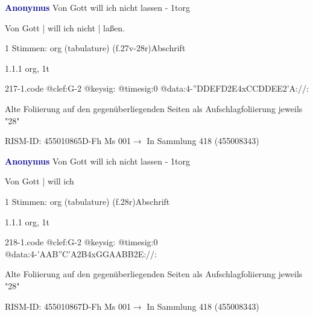 \documentclass[twocolumn, 12pt]{book}
\begin{document}
\par \vspace{16pt} \textcolor{darkblue}{\textbf{Anonymus  }}\hfillplus{\textbf{[217]}}\newline Von Gott will ich nicht lassen - 1t\newline org
\par \begin{itshape}[f.27v, at left:] Von Gott | will ich nicht | laßen.\end{itshape} 
\par \textcolor{darkblue}{}  1 Stimmen: org (tabulature)  (f.27v-28r)\newline Abschrift
\par 1.1.1  org, 1t  
\begin{filecontents*}{217-1.code}
@clef:G-2
@keysig:
@timesig:0
@data:4-''DDEFD2E4xCCDDEE2'A://:
\end{filecontents*}
\newline %
\par Alte Foliierung auf den gegenüberliegenden Seiten als Aufschlagfoliierung jeweils "28"
\par RISM-ID: 455010865\newline D-Fh  Ms 001\newline $\rightarrow$ In Sammlung 418 (455008343)
      
\par \vspace{16pt} \textcolor{darkblue}{\textbf{Anonymus  }}\hfillplus{\textbf{[218]}}\newline Von Gott will ich nicht lassen - 1t\newline org
\par \begin{itshape}[f.28r, at left:] Von Gott | will ich\end{itshape} 
\par \textcolor{darkblue}{}  1 Stimmen: org (tabulature)  (f.28r)\newline Abschrift
\par 1.1.1  org, 1t  
\begin{filecontents*}{218-1.code}
@clef:G-2
@keysig:
@timesig:0
@data:4-'AAB''C'A2B4xGGAABB2E://:
\end{filecontents*}
\newline %
\par Alte Foliierung auf den gegenüberliegenden Seiten als Aufschlagfoliierung jeweils "28"
\par RISM-ID: 455010867\newline D-Fh  Ms 001\newline $\rightarrow$ In Sammlung 418 (455008343)
      
\end{document}
